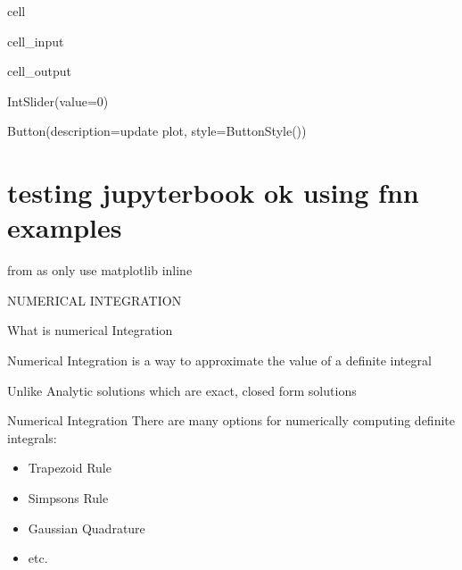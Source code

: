 \documentclass[letterpaper,10pt,english]{jupyterBook}
\begin{document}
\begin{sphinxuseclass}{cell}
\begin{sphinxVerbatimInput}
\begin{sphinxuseclass}{cell_input}
\begin{sphinxVerbatim}[commandchars=\\\{\}]
\end{sphinxVerbatim}

\end{sphinxuseclass}\end{sphinxVerbatimInput}
\begin{sphinxVerbatimOutput}

\begin{sphinxuseclass}{cell_output}
\begin{sphinxVerbatim}[commandchars=\\\{\}]
IntSlider(value=0)
\end{sphinxVerbatim}

\begin{sphinxVerbatim}[commandchars=\\\{\}]
Button(description=\PYGZsq{}update plot\PYGZsq{}, style=ButtonStyle())
\end{sphinxVerbatim}

\end{sphinxuseclass}\end{sphinxVerbatimOutput}

\end{sphinxuseclass}
\sphinxstepscope


\chapter{testing jupyter\sphinxhyphen{}book ok using fnn examples}
\label{\detokenize{fnn:testing-jupyter-book-ok-using-fnn-examples}}\label{\detokenize{fnn::doc}}
\sphinxAtStartPar
from 
as only use matplotlib inline

\sphinxAtStartPar
NUMERICAL INTEGRATION

\sphinxAtStartPar
What is numerical Integration

\sphinxAtStartPar
Numerical Integration is a way to approximate the value of a definite integral

\sphinxAtStartPar
Unlike Analytic solutions which are exact, closed form solutions

\sphinxAtStartPar
Numerical Integration
There are many options for numerically computing definite integrals:
\begin{itemize}
\item {} 
\sphinxAtStartPar
Trapezoid Rule

\item {} 
\sphinxAtStartPar
Simpsons Rule

\item {} 
\sphinxAtStartPar
Gaussian Quadrature

\item {} 
\sphinxAtStartPar
etc.

\end{itemize}
\end{document}
